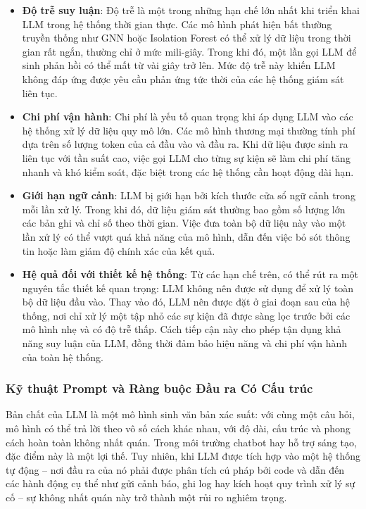 \begin{itemize}[label=--]
    \item \textbf{Độ trễ suy luận}: Độ trễ là một trong những hạn chế lớn nhất khi triển khai LLM trong hệ thống thời gian thực. Các mô hình phát hiện bất thường truyền thống như GNN hoặc Isolation Forest có thể xử lý dữ liệu trong thời gian rất ngắn, thường chỉ ở mức mili-giây. Trong khi đó, một lần gọi LLM để sinh phản hồi có thể mất từ vài giây trở lên. Mức độ trễ này khiến LLM không đáp ứng được yêu cầu phản ứng tức thời của các hệ thống giám sát liên tục.
    \item \textbf{Chi phí vận hành}: Chi phí là yếu tố quan trọng khi áp dụng LLM vào các hệ thống xử lý dữ liệu quy mô lớn. Các mô hình thương mại thường tính phí dựa trên số lượng token của cả đầu vào và đầu ra. Khi dữ liệu được sinh ra liên tục với tần suất cao, việc gọi LLM cho từng sự kiện sẽ làm chi phí tăng nhanh và khó kiểm soát, đặc biệt trong các hệ thống cần hoạt động dài hạn.
    \item \textbf{Giới hạn ngữ cảnh}: LLM bị giới hạn bởi kích thước cửa sổ ngữ cảnh trong mỗi lần xử lý. Trong khi đó, dữ liệu giám sát thường bao gồm số lượng lớn các bản ghi và chỉ số theo thời gian. Việc đưa toàn bộ dữ liệu này vào một lần xử lý có thể vượt quá khả năng của mô hình, dẫn đến việc bỏ sót thông tin hoặc làm giảm độ chính xác của kết quả.
    \item \textbf{Hệ quả đối với thiết kế hệ thống}: Từ các hạn chế trên, có thể rút ra một nguyên tắc thiết kế quan trọng: LLM không nên được sử dụng để xử lý toàn bộ dữ liệu đầu vào. Thay vào đó, LLM nên được đặt ở giai đoạn sau của hệ thống, nơi chỉ xử lý một tập nhỏ các sự kiện đã được sàng lọc trước bởi các mô hình nhẹ và có độ trễ thấp. Cách tiếp cận này cho phép tận dụng khả năng suy luận của LLM, đồng thời đảm bảo hiệu năng và chi phí vận hành của toàn hệ thống.
\end{itemize}

\subsubsection{Kỹ thuật Prompt và Ràng buộc Đầu ra Có Cấu trúc}
Bản chất của LLM là một mô hình sinh văn bản xác suất: với cùng một câu hỏi, mô hình có thể trả lời theo vô số cách khác nhau, với độ dài, cấu trúc và phong cách hoàn toàn không nhất quán. Trong môi trường chatbot hay hỗ trợ sáng tạo, đặc điểm này là một lợi thế. Tuy nhiên, khi LLM được tích hợp vào một hệ thống tự động – nơi đầu ra của nó phải được phân tích cú pháp bởi code và dẫn đến các hành động cụ thể như gửi cảnh báo, ghi log hay kích hoạt quy trình xử lý sự cố – sự không nhất quán này trở thành một rủi ro nghiêm trọng.

